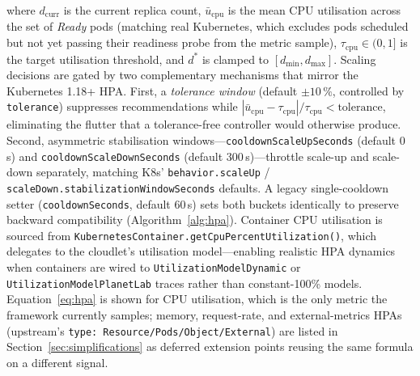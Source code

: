 \documentclass[ASNA,twocolumn]{USG}
\begin{document}
    where $d_{\mathrm{curr}}$ is the current replica count,
    $\bar{u}_{\mathrm{cpu}}$ is the mean CPU utilisation across the set of
    \emph{Ready} pods (matching real Kubernetes, which excludes pods
    scheduled but not yet passing their readiness probe from the metric
    sample), $\tau_{\mathrm{cpu}} \in (0,1]$ is the target utilisation
    threshold, and $d^*$ is clamped to $[d_{\min}, d_{\max}]$. Scaling
    decisions are gated by two complementary mechanisms that mirror the
    Kubernetes 1.18+ HPA. First, a \emph{tolerance window} (default
    $\pm10\,\%$, controlled by \texttt{tolerance}) suppresses
    recommendations while $|\bar{u}_{\mathrm{cpu}} -
    \tau_{\mathrm{cpu}}|/\tau_{\mathrm{cpu}} < \mathrm{tolerance}$,
    eliminating the flutter that a tolerance-free controller would
    otherwise produce. Second, asymmetric stabilisation
    windows---\texttt{cooldownScaleUpSeconds} (default $0$\,s) and
    \texttt{cooldownScaleDownSeconds} (default $300$\,s)---throttle
    scale-up and scale-down separately, matching K8s'
    \texttt{behavior.scaleUp} / \texttt{scaleDown.stabilizationWindowSeconds}
    defaults. A legacy single-cooldown setter
    (\texttt{cooldownSeconds}, default 60\,s) sets both buckets identically
    to preserve backward compatibility (Algorithm~\ref{alg:hpa}). Container
    CPU utilisation is sourced from
    \texttt{KubernetesContainer.getCpuPercentUtilization()}, which
    delegates to the cloudlet's utilisation model---enabling realistic
    HPA dynamics when containers are wired to \texttt{UtilizationModelDynamic}
    or \texttt{UtilizationModelPlanetLab} traces rather than
    constant-100\% models. Equation~\eqref{eq:hpa} is shown for CPU
    utilisation, which is the only metric the framework currently samples;
    memory, request-rate, and external-metrics HPAs (upstream's
    \texttt{type: Resource/Pods/Object/External}) are listed in
    Section~\ref{sec:simplifications} as deferred extension points reusing
    the same formula on a different signal.
\end{document}
